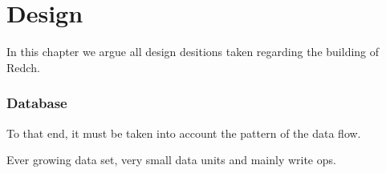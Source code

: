 \chapter{Design}

In this chapter we argue all design desitions taken regarding the building of Redch. 

\subsection{Database}

To that end, it must be taken into account the pattern of the data flow.
  
Ever growing data set, very small data units and mainly write ops.